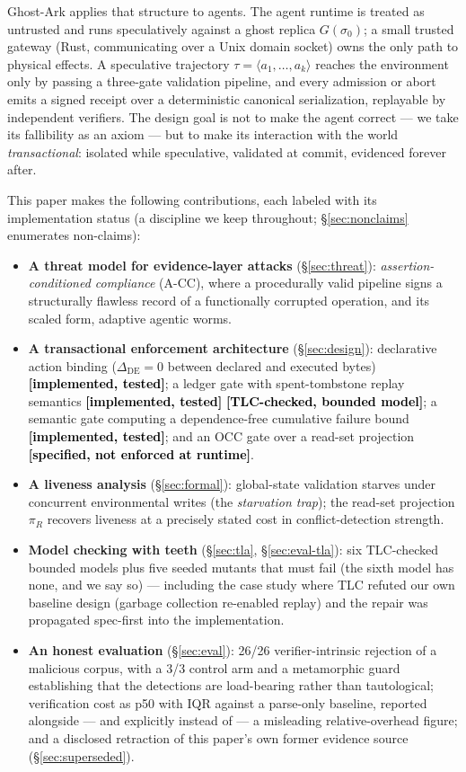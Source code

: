 \documentclass[10pt,twocolumn,letterpaper]{article}
\newcommand{\evthreeintrinsic}{26/26}   %
\newcommand{\evthreecontrol}{3/3}       %
\newcommand{\ghostark}{Ghost-Ark}
\newcommand{\piR}{\pi_R}
\newcommand{\statusimpl}[0]{\textcolor{black}{\textbf{[implemented, tested]}}}
\newcommand{\statusmodel}[0]{\textcolor{black}{\textbf{[TLC-checked, bounded model]}}}
\newcommand{\statusspec}[0]{\textcolor{black}{\textbf{[specified, not enforced at runtime]}}}
\begin{document}
\ghostark{} applies that structure to agents. The agent runtime is treated as
untrusted and runs speculatively against a ghost replica $G(\sigma_0)$; a
small trusted gateway (Rust, communicating over a Unix domain socket) owns the
only path to physical effects. A speculative trajectory
$\tau = \langle a_1,\dots,a_k\rangle$ reaches the environment only by passing
a three-gate validation pipeline, and every admission or abort emits a signed
receipt over a deterministic canonical serialization, replayable by
independent verifiers. The design goal is not to make the agent correct ---
we take its fallibility as an axiom --- but to make its interaction with the
world \emph{transactional}: isolated while speculative, validated at commit,
evidenced forever after.

This paper makes the following contributions, each labeled with its
implementation status (a discipline we keep throughout; \S\ref{sec:nonclaims}
enumerates non-claims):

\begin{itemize}
\item \textbf{A threat model for evidence-layer attacks}
  (\S\ref{sec:threat}): \emph{assertion-conditioned compliance} (A-CC), where
  a procedurally valid pipeline signs a structurally flawless record of a
  functionally corrupted operation, and its scaled form, adaptive agentic
  worms.
\item \textbf{A transactional enforcement architecture}
  (\S\ref{sec:design}): declarative action binding ($\Delta_{\mathrm{DE}}=0$
  between declared and executed bytes) \statusimpl{}; a ledger gate with
  spent-tombstone replay semantics \statusimpl{} \statusmodel{}; a semantic
  gate computing a dependence-free cumulative failure bound \statusimpl{};
  and an OCC gate over a read-set projection \statusspec{}.
\item \textbf{A liveness analysis} (\S\ref{sec:formal}): global-state
  validation starves under concurrent environmental writes (the
  \emph{starvation trap}); the read-set projection $\piR$ recovers liveness
  at a precisely stated cost in conflict-detection strength.
\item \textbf{Model checking with teeth} (\S\ref{sec:tla},
  \S\ref{sec:eval-tla}): six TLC-checked bounded models plus five seeded
  mutants that must fail (the sixth model has none, and we say so) ---
  including the case study where TLC refuted our
  own baseline design (garbage collection re-enabled replay) and the repair
  was propagated spec-first into the implementation.
\item \textbf{An honest evaluation} (\S\ref{sec:eval}): \evthreeintrinsic{}
  verifier-intrinsic rejection of a malicious corpus, with a
  \evthreecontrol{} control arm and a metamorphic guard establishing that the
  detections are load-bearing rather than tautological; verification cost as
  p50 with IQR against a parse-only baseline, reported alongside --- and
  explicitly instead of --- a misleading relative-overhead figure; and a
  disclosed retraction of this paper's own former evidence source
  (\S\ref{sec:superseded}).
\end{itemize}
\end{document}
